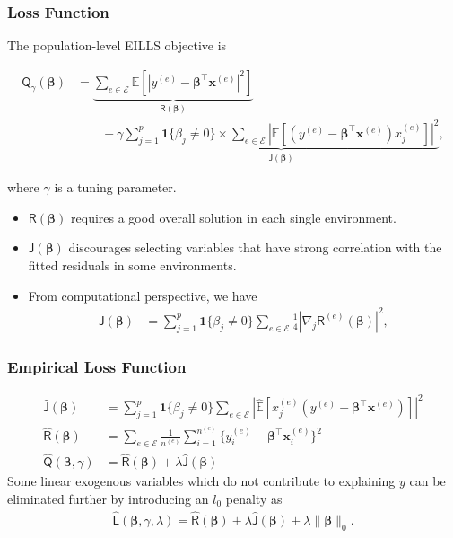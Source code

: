 \begin{frame}
  \frametitle{Loss Function}
  The population-level EILLS objective is 
  \begin{scriptsize}
  \begin{align*}
    \mathsf{Q}_\gamma(\bm\beta) &= \underbrace{\sum_{e\in \mathcal{E}} \mathbb{E} \left[|y^{(e)} - \bm\beta^\top \bm x^{(e)}|^2\right]}_{\mathsf{R}(\bm\beta)} \nonumber\\
                                &\qquad + \gamma \underbrace{\sum_{j=1}^p \mathbf{1}\{\beta_j\neq 0\} \times  \sum_{e\in \mathcal{E}}  \left|\mathbb{E} [(y^{(e)} - \bm\beta^\top \bm x^{(e)}) x_j^{(e)}]\right|^2}_{\mathsf{J}(\bm\beta)},
  \end{align*}
  \end{scriptsize}
  where $\gamma$ is a tuning parameter.
  \begin{itemize}
  \item $\mathsf R(\bm\beta)$ requires a good overall solution in each single environment.
  \item $\mathsf J(\bm\beta)$ discourages selecting variables that have strong correlation with the fitted residuals in some environments.
  \item From computational perspective, we have
    \begin{align*}
    \mathsf{J}(\bm \beta) &= \sum_{j=1}^p \mathbf{1}\{\beta_j \neq 0\} \sum_{e\in \mathcal{E}} \frac{1}{4} |\nabla_j \mathsf{R}^{(e)}(\bm\beta)|^2,
  \end{align*}
  \end{itemize}
\end{frame}

\begin{frame}
  \frametitle{Empirical Loss Function}
  \begin{align*}
    \hat{\mathsf{J}}(\bm\beta) &= \sum_{j=1}^p \mathbf{1}\{\beta_j \neq 0\} \sum_{e\in \mathcal{E}}  \left| \hat{\mathbb{E}}[x_j^{(e)} (y^{(e)} - \bm\beta^\top \bm x^{(e)})]\right|^2\\
    \hat{\mathsf{R}}(\bm\beta)& = \sum_{e\in \mathcal{E}}  \frac{1}{n^{(e)}} \sum_{i=1}^{n^{(e)}} \{ y^{(e)}_i - \bm\beta^\top \bm x^{(e)}_i \}^2\\
    \hat{\mathsf{Q}}(\bm\beta,\gamma) &= \hat{\mathsf{R}}(\bm\beta) + \lambda \hat{\mathsf{J}}(\bm\beta)
  \end{align*}
  Some linear exogenous variables which do not contribute to explaining $y$ can
  be eliminated further by introducing an $l_0$ penalty as
    \begin{align*}
   \hat{\mathsf{L}}(\bm\beta,\gamma,\lambda) =  \hat{\mathsf{R}}(\bm\beta) + \lambda \hat{\mathsf{J}}(\bm\beta) + \lambda \|\bm\beta\|_0.
  \end{align*}
\end{frame}

